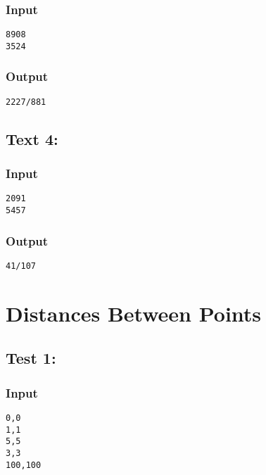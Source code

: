 \documentclass[twocolumn,9pt]{extarticle}
\begin{document}
\subsubsection*{Input}
\texttt{8908\\3524}

\subsubsection*{Output}
\texttt{2227/881}

\subsection*{Text 4:}
\subsubsection*{Input}
\texttt{2091\\5457}

\subsubsection*{Output}
\texttt{41/107}




\section{Distances Between Points}
\subsection*{Test 1:}
\subsubsection*{Input}
\texttt{0,0\\
1,1\\
5,5\\
3,3\\
100,100}
\end{document}
